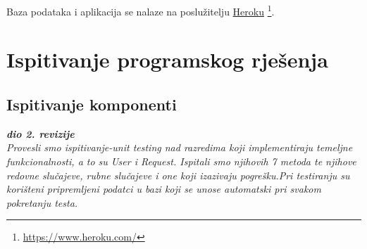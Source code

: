             Baza podataka i aplikacija se nalaze na poslužitelju \underline{Heroku}
            \footnote{\url{https://www.heroku.com/}}.
            
        
\newpage 

		    \section{Ispitivanje programskog rješenja}

        
        \subsection{Ispitivanje komponenti}
		    
		    \textbf{\textit{dio 2. revizije}}\\
    
			\textit { Provesli smo  ispitivanje-unit testing nad razredima koji implementiraju temeljne funkcionalnosti, a to su User i Request. Ispitali smo njihovih 7 metoda te njihove redovne slučajeve, rubne slučajeve i one koji izazivaju pogrešku.Pri testiranju su korišteni pripremljeni podatci u bazi koji se unose automatski pri svakom pokretanju testa. }
			
